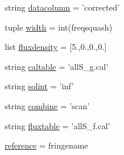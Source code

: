 \begin{DoxyCompactItemize}
\item 
string \hyperlink{namespacepipeline2_a6db2705d3f51006c94b13097481c505f}{datacolumn} = 'corrected'
\item 
tuple \hyperlink{namespacepipeline2_aec9886cf4209514eae9e12aca94936cf}{width} = int(freqsquash)
\item 
list \hyperlink{namespacepipeline2_a65fe7b638c2ec2dbe122309794a26e61}{fluxdensity} = \mbox{[}5.,0.,0.,0.\mbox{]}
\item 
string \hyperlink{namespacepipeline2_a2a62d898dc748d69f71f3a996be4d11d}{caltable} = 'all\-S\-\_\-g.\-cal'
\item 
string \hyperlink{namespacepipeline2_a8ff86f1f8a4cb4f9823cf2b8c41e3c53}{solint} = 'inf'
\item 
string \hyperlink{namespacepipeline2_a1b65be692b8ea61e4a3fe7631be543c0}{combine} = 'scan'
\item 
string \hyperlink{namespacepipeline2_a38feb1a89a8db932571973723e4659dc}{fluxtable} = 'all\-S\-\_\-f.\-cal'
\item 
\hyperlink{namespacepipeline2_aee2c9efd24537f7f72f37ea4c0fae8cc}{reference} = fringename
\end{DoxyCompactItemize}


